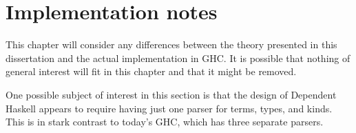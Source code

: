 \chapter{Implementation notes}
\label{cha:implementation}

\begin{proposal}
This chapter will consider any differences between the theory presented
in this dissertation and the actual implementation in GHC. It is possible
that nothing of general interest will fit in this chapter and that it might
be removed.

One possible subject of interest in this section is that the design of
Dependent Haskell appears to require having just one parser for terms,
types, and kinds. This is in stark contrast to today's GHC, which has
three separate parsers.
\end{proposal}
